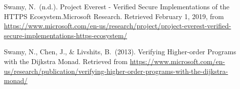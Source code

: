 \documentclass[12pt,twoside]{article}
\begin{document}
{\begin{thebibliography}{1079}
\mdbibitemlabel{}Swamy, N.~(n.d.). Project Everest - Verified Secure Implementations of the HTTPS Ecosystem.Microsoft Research. Retrieved February 1, 2019, from \href{https://www.microsoft.com/en-us/research/project/project-everest-verified-secure-implementations-https-ecosystem/}{{\ttfamily https://\hspace{0pt}www.\hspace{0pt}microsoft.\hspace{0pt}com/\hspace{0pt}en-\hspace{0pt}us/\hspace{0pt}research/\hspace{0pt}project/\hspace{0pt}project-\hspace{0pt}everest-\hspace{0pt}verified-\hspace{0pt}secure-\hspace{0pt}implementations-\hspace{0pt}https-\hspace{0pt}ecosystem/\hspace{0pt}}}%

\mdbibitemlabel{}Swamy, N., Chen, J., \& Livshits, B.~(2013). Verifying Higher-order Programs with the Dijkstra Monad. Retrieved from \href{https://www.microsoft.com/en-us/research/publication/verifying-higher-order-programs-with-the-dijkstra-monad/}{{\ttfamily https://\hspace{0pt}www.\hspace{0pt}microsoft.\hspace{0pt}com/\hspace{0pt}en-\hspace{0pt}us/\hspace{0pt}research/\hspace{0pt}publication/\hspace{0pt}verifying-\hspace{0pt}higher-\hspace{0pt}order-\hspace{0pt}programs-\hspace{0pt}with-\hspace{0pt}the-\hspace{0pt}dijkstra-\hspace{0pt}monad/\hspace{0pt}}}%


\end{thebibliography}}
\end{document}
